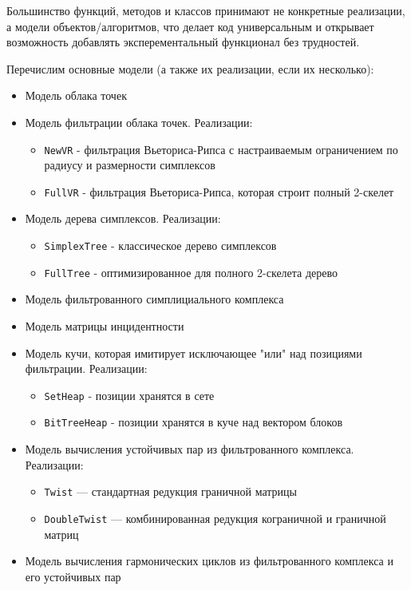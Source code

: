 \documentclass{article}
\begin{document}
Большинство функций, методов и классов принимают не конкретные реализации, а модели объектов/алгоритмов, что делает код универсальным и открывает возможность добавлять эксперементальный функционал без трудностей.

Перечислим основные модели (а также их реализации, если их несколько):

\begin{itemize}
  \item Модель облака точек
  \item Модель фильтрации облака точек. Реализации:
  \begin{itemize}
    \item \texttt{NewVR} - фильтрация Вьеториса-Рипса с настраиваемым ограничением по радиусу и размерности симплексов \autocite{new_vr}
    \item \texttt{FullVR} - фильтрация Вьеториса-Рипса, которая строит полный 2-скелет
  \end{itemize}
  \item Модель дерева симплексов. Реализации:
  \begin{itemize}
    \item \texttt{SimplexTree} - классическое дерево симплексов \autocite{simplextree}
    \item \texttt{FullTree} - оптимизированное для полного 2-скелета дерево
  \end{itemize}
  \item Модель фильтрованного симплициального комплекса
  \item Модель матрицы инцидентности
  \item Модель кучи, которая имитирует исключающее "или" над позициями фильтрации. Реализации:
  \begin{itemize}
    \item \texttt{SetHeap} - позиции хранятся в сете
    \item \texttt{BitTreeHeap} - позиции хранятся в куче над вектором блоков \autocite{bittreecolumn}
  \end{itemize}
  \item Модель вычисления устойчивых пар из фильтрованного комплекса. Реализации:
  \begin{itemize}
    \item \texttt{Twist} — стандартная редукция граничной матрицы \autocite{twist}
    \item \texttt{DoubleTwist} — комбинированная редукция кограничной и граничной матриц \autocite{doubletwist}
  \end{itemize}
  \item Модель вычисления гармонических циклов из фильтрованного комплекса и его устойчивых пар
\end{itemize}
\end{document}
